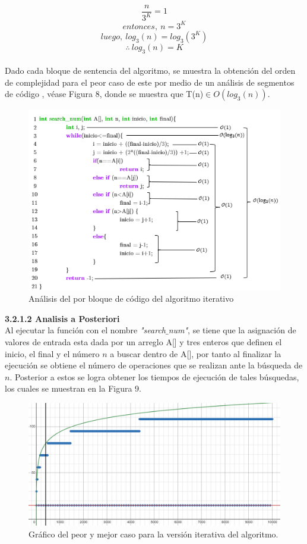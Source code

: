 \documentclass[12pt,twoside]{article}
\begin{document}
                $$\frac{n}{3^{K}}=1$$
                $$entonces,~n=3^{K}$$
                $$luego,~log_3{(n)}=log_3{(3^{K})}$$
                $$\therefore~log_3{(n)}=K$$
                \\
                Dado cada bloque de sentencia del algoritmo, se muestra la obtenci\'on del orden de complejidad para el peor caso de este por medio de un an\'alisis de segmentos de c\'odigo , v\'ease Figura 8, donde se muestra que T(n)$\in O(log_3{(n)})$.
                \begin{figure}[H]
                    \centering
                    \includegraphics[width=14cm]{imagenes/figura3_2_1.png}
                    \caption{An\'alisis del por bloque de c\'odigo del algoritmo iterativo}
                    \label{fig:my_label}
                \end{figure}
                {\bf 3.2.1.2 Analisis a Posteriori}\\[0.2cm]
                Al ejecutar la funci\'on con el nombre \textit{"search$\_$num"}, se tiene que la asignaci\'on de valores de entrada esta dada por un arreglo A[] y tres enteros que definen el inicio, el final y el n\'umero $n$ a buscar dentro de A[], por tanto al finalizar la ejecuci\'on se obtiene el n\'umero de operaciones que se realizan ante la b\'usqueda de $n$. Posterior a estos se logra obtener los tiempos de ejecuci\'on de tales b\'usquedas, los cuales se muestran en la Figura 9.
                \begin{figure}[H]
                    \centering
                    \includegraphics[width=14cm]{imagenes/figura3_2_2.png}
                    \caption{Gráfico del peor y mejor caso para la versi\'on iterativa del algoritmo.}
                \end{figure}
\end{document}
